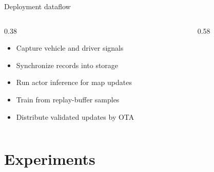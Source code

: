 \documentclass[aspectratio=169,professionalfonts]{beamer}
\begin{document}
\begin{frame}[label={sec:org67cbc67}]{Deployment dataflow}
\begin{columns}
\begin{column}{0.38\columnwidth}
\begin{itemize}
\item Capture vehicle and driver signals
\item Synchronize records into storage
\item Run actor inference for map updates
\item Train from replay-buffer samples
\item Distribute validated updates by OTA
\end{itemize}
\end{column}
\begin{column}{0.58\columnwidth}
\begin{center}
\def\svgwidth{0.7\linewidth}

\end{center}
\end{column}
\end{columns}
\end{frame}
\section*{Experiments}
\label{sec:orgeb63067}
\end{document}
